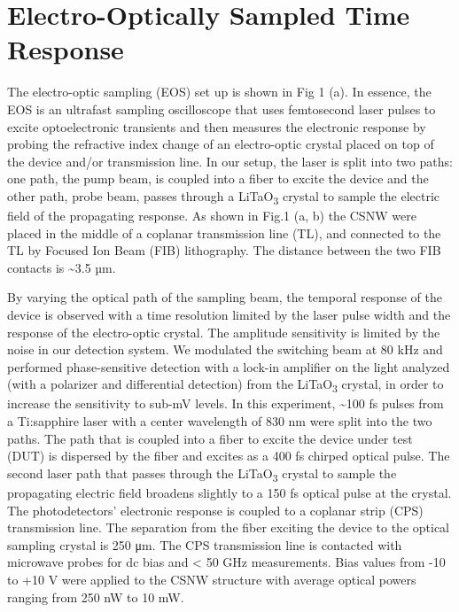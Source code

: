 \section{Electro-Optically Sampled Time Response}

The electro-optic sampling (EOS) set up is shown in Fig 1 (a). In
essence, the EOS is an ultrafast sampling oscilloscope that uses
femtosecond laser pulses to excite optoelectronic transients and then
measures the electronic response by probing the refractive index change
of an electro-optic crystal placed on top of the device and/or
transmission line. In our setup, the laser is split into two paths: one
path, the pump beam, is coupled into a fiber to excite the device and
the other path, probe beam, passes through a LiTaO\textsubscript{3}
crystal to sample the electric field of the propagating response. As
shown in Fig.1 (a, b) the CSNW were placed in the middle of a coplanar
transmission line (TL), and connected to the TL by Focused Ion Beam
(FIB) lithography. The distance between the two FIB contacts is
\textasciitilde{}3.5 µm.

By varying the optical path of the sampling beam, the temporal response
of the device is observed with a time resolution limited by the laser
pulse width and the response of the electro-optic crystal. The amplitude
sensitivity is limited by the noise in our detection system. We
modulated the switching beam at 80 kHz and performed phase-sensitive
detection with a lock-in amplifier on the light analyzed (with a
polarizer and differential detection) from the LiTaO\textsubscript{3}
crystal, in order to increase the sensitivity to sub-mV levels. In this
experiment, \textasciitilde{}100 fs pulses from a Ti:sapphire laser with
a center wavelength of 830 nm were split into the two paths. The path
that is coupled into a fiber to excite the device under test (DUT) is
dispersed by the fiber and excites as a 400 fs chirped optical pulse.
The second laser path that passes through the LiTaO\textsubscript{3}
crystal to sample the propagating electric field broadens slightly to a
150 fs optical pulse at the crystal. The photodetectors' electronic
response is coupled to a coplanar strip (CPS) transmission line. The
separation from the fiber exciting the device to the optical sampling
crystal is 250 μm. The CPS transmission line is contacted with microwave
probes for dc bias and \textless{} 50 GHz measurements. Bias values from
-10 to +10 V were applied to the CSNW structure with average optical
powers ranging from 250 nW to 10 mW.

